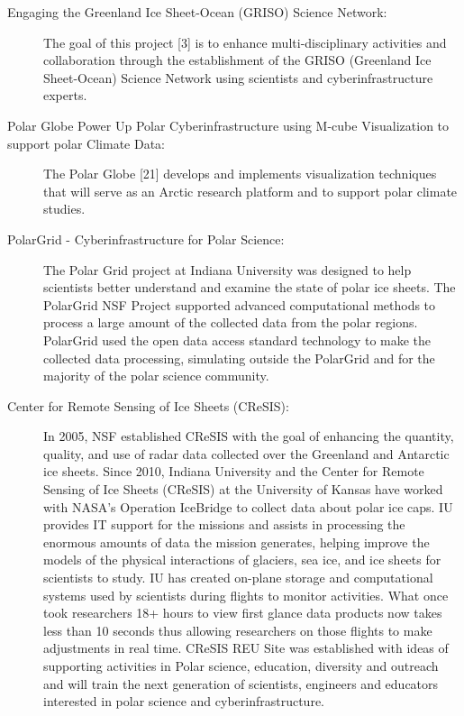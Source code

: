 \documentclass[10pt,letterpaper,draft]{article}
\begin{document}
\begin{description}
\item [Engaging the Greenland Ice Sheet-Ocean (GRISO) Science Network:]

The goal of this project [3] is to enhance multi-disciplinary activities and collaboration through the establishment of the GRISO (Greenland Ice Sheet-Ocean) Science Network using scientists and cyberinfrastructure experts.

\item [Polar Globe Power Up Polar Cyberinfrastructure using M-cube Visualization to support polar Climate Data:]
 The Polar Globe [21] develops and implements visualization techniques that will serve as an Arctic research platform and to support polar climate studies.
 
 \item[PolarGrid - Cyberinfrastructure for Polar Science:]
  The Polar Grid project at Indiana University was designed to help scientists better understand and examine the state of polar ice sheets. The PolarGrid NSF Project supported advanced computational methods to process a large amount of the collected data from the polar regions. PolarGrid used the open data access standard technology to make the collected data processing, simulating outside the PolarGrid and for the majority of the polar science community.

\item[Center for Remote Sensing of Ice Sheets (CReSIS):] In 2005, NSF established CReSIS  with the goal of enhancing the quantity, quality, and use of radar data collected over the Greenland and Antarctic ice sheets. Since 2010, Indiana University and the Center for Remote Sensing of Ice Sheets (CReSIS) at the University of Kansas have worked with NASA's Operation IceBridge to collect data about polar ice caps. IU provides IT support for the missions and assists in processing the enormous amounts of data the mission generates, helping improve the models of the physical interactions of glaciers, sea ice, and ice sheets for scientists to study. IU has created on-plane storage and computational systems used by scientists during flights to monitor activities. What once took researchers 18+ hours to view first glance data products now takes less than 10 seconds thus allowing researchers on those flights to make adjustments in real time.   CReSIS REU Site was established with ideas of supporting activities in Polar science, education, diversity and outreach and will train the next generation of scientists, engineers and educators interested in polar science and cyberinfrastructure.


\end{description}
\end{document}

